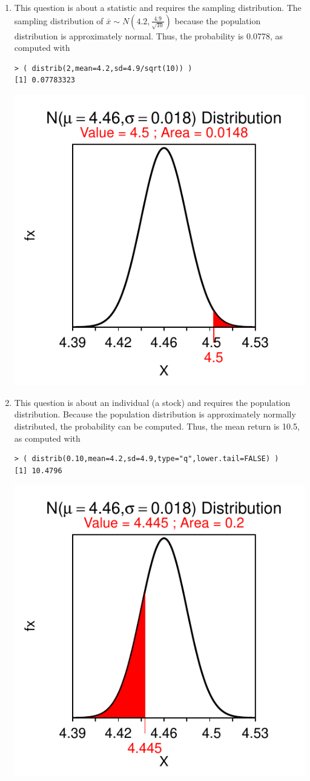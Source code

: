 \documentclass[10pt,openany]{book}\usepackage[]{graphicx}\usepackage[]{color}
\makeatletter
\newenvironment{kframe}{%
 \def\at@end@of@kframe{}%
 \ifinner\ifhmode%
  \def\at@end@of@kframe{\end{minipage}}%
  \begin{minipage}{\columnwidth}%
 \fi\fi%
 \def\FrameCommand##1{\hskip\@totalleftmargin \hskip-\fboxsep
 \colorbox{shadecolor}{##1}\hskip-\fboxsep
     \hskip-\linewidth \hskip-\@totalleftmargin \hskip\columnwidth}%
 \MakeFramed {\advance\hsize-\width
   \@totalleftmargin\z@ \linewidth\hsize
   \@setminipage}}%
 {\par\unskip\endMakeFramed%
 \at@end@of@kframe}
\newenvironment{knitrout}{}{} %
\makeatother
\begin{document}
\begin{itemize}
\begin{enumerate}
\begin{knitrout}
{}



\end{knitrout}
       \item This question is about a statistic and requires the sampling distribution.  The sampling distribution of $\bar{x}\sim N(4.2,\frac{4.9}{\sqrt{10}})$ because the population distribution is approximately normal.  Thus, the probability is 0.0778, as computed with
\begin{knitrout}
\color{fgcolor}\begin{kframe}
\begin{verbatim}
> ( distrib(2,mean=4.2,sd=4.9/sqrt(10)) )
[1] 0.07783323
\end{verbatim}
\end{kframe}

{\centering \includegraphics[width=.4\linewidth]{Figs/unnamed-chunk-323-1} 

}



\end{knitrout}
       \item This question is about an individual (a stock) and requires the population distribution. Because the population distribution is approximately normally distributed, the probability can be computed.  Thus, the mean return is 10.5, as computed with
\begin{knitrout}
\color{fgcolor}\begin{kframe}
\begin{verbatim}
> ( distrib(0.10,mean=4.2,sd=4.9,type="q",lower.tail=FALSE) )
[1] 10.4796
\end{verbatim}
\end{kframe}

{\centering \includegraphics[width=.4\linewidth]{Figs/unnamed-chunk-324-1} 

}
\end{knitrout}
\end{enumerate}
\end{itemize}
\end{document}
